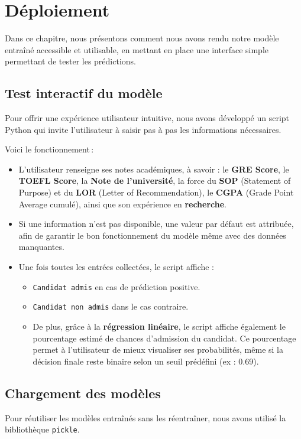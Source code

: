 \chapter{Déploiement}

Dans ce chapitre, nous présentons comment nous avons rendu notre modèle entraîné accessible et utilisable, en mettant en place une interface simple permettant de tester les prédictions.

\section{Test interactif du modèle}
Pour offrir une expérience utilisateur intuitive, nous avons développé un script Python qui invite l'utilisateur à saisir pas à pas les informations nécessaires.  

Voici le fonctionnement :

\begin{itemize}
    \item L'utilisateur renseigne ses notes académiques, à savoir : le \textbf{GRE Score}, le \textbf{TOEFL Score}, la \textbf{Note de l'université}, la force du \textbf{SOP} (Statement of Purpose) et du \textbf{LOR} (Letter of Recommendation), le \textbf{CGPA} (Grade Point Average cumulé), ainsi que son expérience en \textbf{recherche}.
    \item Si une information n’est pas disponible, une valeur par défaut est attribuée, afin de garantir le bon fonctionnement du modèle même avec des données manquantes.
    \item Une fois toutes les entrées collectées, le script affiche :
    \begin{itemize}
        \item \texttt{Candidat  admis} en cas de prédiction positive.
        \item \texttt{Candidat  non admis} dans le cas contraire.
        \item De plus, grâce à la \textbf{régression linéaire}, le script affiche également le pourcentage estimé de chances d’admission du candidat. Ce pourcentage permet à l’utilisateur de mieux visualiser ses probabilités, même si la décision finale reste binaire selon un seuil prédéfini (ex : 0.69).
    \end{itemize}
\end{itemize}

\section{Chargement des modèles}
Pour réutiliser les modèles entraînés sans les réentraîner, nous avons utilisé la bibliothèque \texttt{pickle}.  

